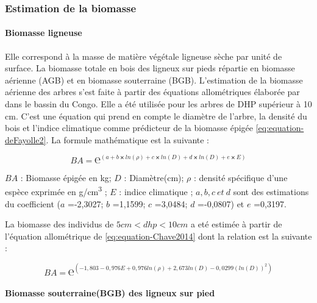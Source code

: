 \documentclass[
  12pt,
  a4paper,
  extrafontsizes,
  onecolumn,
  openright]{book}
\theoremstyle{definition}
\theoremstyle{definition}
\theoremstyle{definition}
\theoremstyle{definition}
\theoremstyle{remark}
\begin{document}
\hypertarget{estimation-de-la-biomasse}{%
\subsubsection{Estimation de la biomasse}\label{estimation-de-la-biomasse}}

\hypertarget{biomasse-ligneuse}{%
\paragraph{Biomasse ligneuse}\label{biomasse-ligneuse}}

Elle correspond à la masse de matière végétale ligneuse sèche par unité de surface. La biomasse totale en bois des ligneux sur pieds répartie en biomasse aérienne (AGB) et en biomasse souterraine (BGB). L'estimation de la biomasse aérienne des arbres s'est faite à partir des équations allométriques élaborée par \citet{Fayolle2018} dans le bassin du Congo. Elle a été utilisée pour les arbres de DHP supérieur à 10 cm. C'est une équation qui prend en compte le diamètre de l'arbre, la densité du bois et l'indice climatique comme prédicteur de la biomasse épigée \eqref{eq:equation-deFayolle2}. La formule mathématique est la suivante :

\begin{equation}
BA=℮^{\left(a+b⨯ln(\rho)+c⨯ln(D)+d⨯ln(D)+e⨯E\right)}
\label{eq:equation-deFayolle2}
\end{equation}

\(BA\) : Biomasse épigée en kg;
\(D\) : Diamètre(cm);
\(ρ\) : densité spécifique d'une espèce exprimée en g/cm\textsuperscript{3} ;
\(E\) : indice climatique ;
\(a, b, c\ et\ d\) sont des estimations du coefficient (\(a\) =-2,3027; \(b\) =1,1599; \(c\) =3,0484; \(d\) =-0,0807) et \(e\) =0,3197.

La biomasse des individus de \(5 cm < dhp < 10 cm\) a eté estimée à partir de l'équation allométrique de \citet{Chave2014} \eqref{eq:equation-Chave2014} dont la relation est la suivante :

\begin{equation}
BA=℮^{\left(-1,803-0,976E+0,976ln(\rho)+2,673ln(D)-0,0299(ln(D))^2\right)}
\label{eq:equation-Chave2014}
\end{equation}

\hypertarget{biomasse-souterrainebgb-des-ligneux-sur-pied}{%
\paragraph{Biomasse souterraine(BGB) des ligneux sur pied}\label{biomasse-souterrainebgb-des-ligneux-sur-pied}}
\end{document}
